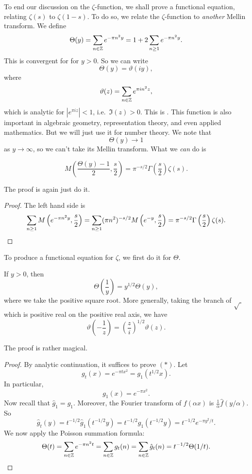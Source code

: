 \documentclass[a4paper]{article}
\begin{document}
To end our discussion on the $\zeta$-function, we shall prove a functional equation, relating $\zeta(s)$ to $\zeta(1 - s)$. To do so, we relate the $\zeta$-function to \emph{another} Mellin transform. We define\index{$\Theta$}
\[
  \Theta(y) = \sum_{n \in \mathbb{Z}} e^{-\pi n^2 y} = 1 + 2 \sum_{n \geq 1} e^{-\pi n^2 y}.
\]
This is convergent for for $y > 0$. So we can write\index{$\vartheta$}
\[
  \Theta(y) = \vartheta(iy),
\]
where
\[
  \vartheta(z) = \sum_{n \in \mathbb{Z}} e^{\pi i n^2 z},
\]
which is analytic for $|e^{\pi i z}| < 1$, i.e.\ $\Im(z) > 0$. This is . This function is also important in algebraic geometry, representation theory, and even applied mathematics. But we will just use it for number theory. We note that
\[
  \Theta(y) \to 1
\]
as $y \to \infty$, so we can't take its Mellin transform. What we \emph{can} do is
\begin{prop}
  \[
    M\left(\frac{\Theta(y) - 1}{2}, \frac{s}{2}\right) = \pi^{-s/2} \Gamma\left(\frac{s}{2}\right) \zeta(s).
  \]
\end{prop}

The proof is again just do it.
\begin{proof}
  The left hand side is
  \[
    \sum_{n \geq 1} M\left(e^{-\pi n^2 y}, \frac{s}{2}\right) = \sum_{n \geq 1} (\pi n^2) ^{-s/2} M\left(e^{-y}, \frac{s}{2}\right) = \pi^{-s/2} \Gamma\left(\frac{s}{2}\right) \zeta(s).\qedhere
  \]
\end{proof}

To produce a functional equation for $\zeta$, we first do it for $\Theta$.

\begin{thm}
  If $y > 0$, then
  \[
    \Theta\left(\frac{1}{y}\right) = y^{1/2} \Theta(y)\tag{$*$},
  \]
  where we take the positive square root. More generally, taking the branch of $\sqrt{\;}$ which is positive real on the positive real axis, we have
  \[
    \vartheta \left(-\frac{1}{z}\right) = \left(\frac{z}{i}\right)^{1/2} \vartheta(z).
  \]
\end{thm}

The proof is rather magical.
\begin{proof}
  By analytic continuation, it suffices to prove $(*)$. Let
  \[
    g_t(x) = e^{-\pi t x^2} = g_1(t^{1/2} x).
  \]
  In particular,
  \[
    g_1(x) = e^{-\pi x^2}.
  \]
  Now recall that $\hat{g}_1 = g_1$. Moreover, the Fourier transform of $f(\alpha x)$ is $\frac{1}{\alpha} \hat{f}(y/\alpha)$. So
  \[
    \hat{g}_t(y) = t^{-1/2} \hat{g}_1(t^{-1/2} y) = t^{-1/2} g_1(t^{-1/2} y) = t^{-1/2} e^{-\pi y^2/t}.
  \]
  We now apply the Poisson summation formula:
  \[
    \Theta(t) = \sum_{n \in \mathbb{Z}} e^{-\pi n^2 t} = \sum_{n \in \mathbb{Z}} g_t(n) = \sum_{n \in \mathbb{Z}} \hat{g}_t(n) = t^{-1/2} \Theta(1/t).\qedhere
  \]
\end{proof}
\end{document}
